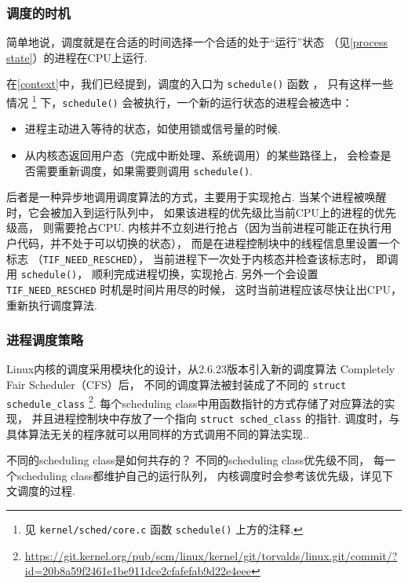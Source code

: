 \subsubsection{调度的时机}
简单地说，调度就是在合适的时间选择一个合适的处于“运行”状态
（见\ref{process state}）的进程在CPU上运行.

在\ref{context}中，我们已经提到，调度的入口为 \lstinline{schedule()} 函数%
，
只有这样一些情况
\footnote{见 \lstinline{kernel/sched/core.c} 函数 \lstinline{schedule()} 上方的注释.}
下，\lstinline{schedule()} 会被执行，一个新的运行状态的进程会被选中：
\begin{itemize}
	\item 进程主动进入等待的状态，如使用锁或信号量的时候.
	\item 从内核态返回用户态（完成中断处理、系统调用）的某些路径上，
	      会检查是否需要重新调度，如果需要则调用 \lstinline{schedule()}.
\end{itemize}
后者是一种异步地调用调度算法的方式，主要用于实现抢占. 
当某个进程被唤醒时，它会被加入到运行队列中，
如果该进程的优先级比当前CPU上的进程的优先级高，
则需要抢占CPU.
内核并不立刻进行抢占（因为当前进程可能正在执行用户代码，并不处于可以切换的状态），
而是在进程控制块中的线程信息里设置一个标志
（\lstinline{TIF_NEED_RESCHED}），
当前进程下一次处于内核态并检查该标志时，
即调用 \lstinline{schedule()}，
顺利完成进程切换，实现抢占.
另外一个会设置 \lstinline{TIF_NEED_RESCHED} 时机是时间片用尽的时候，
这时当前进程应该尽快让出CPU，重新执行调度算法.

\subsubsection{进程调度策略}
Linux内核的调度采用模块化的设计，从2.6.23版本引入新的调度算法
Completely Fair Scheduler（CFS）后\cite{Linux2_6_23:online}，
不同的调度算法被封装成了不同的 \lstinline{struct schedule_class}
\footnote{\url{https://git.kernel.org/pub/scm/linux/kernel/git/torvalds/linux.git/commit/?id=20b8a59f2461e1be911dce2cfafefab9d22e4eee}}.
每个scheduling class中用函数指针的方式存储了对应算法的实现，
并且进程控制块中存放了一个指向 \lstinline{struct sched_class} 的指针.
调度时，与具体算法无关的程序就可以用同样的方式调用不同的算法实现.\cite{CFSSched96:online}.

\begin{qbox}{不同的scheduling class是如何共存的？}
	不同的scheduling class优先级不同，
	每一个scheduling class都维护自己的运行队列，
	内核调度时会参考该优先级，详见下文调度的过程.
\end{qbox}

